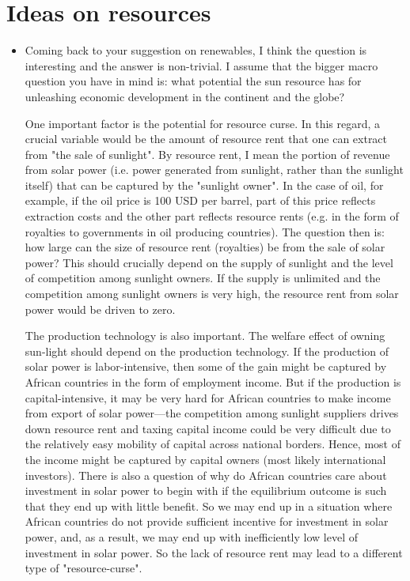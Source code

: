 \documentclass[12pt]{article}%
\begin{document}
\section{Ideas on resources}
\begin{itemize}
     
\item Coming back to your suggestion on renewables, I think the question is interesting and the answer is non-trivial. I assume that the bigger macro question you have in mind is: what potential the sun resource has for unleashing economic development in the continent and the globe? 

One important factor is the potential for resource curse. In this regard, a crucial variable would be the amount of resource rent that one can extract from "the sale of sunlight". By resource rent, I mean the portion of revenue from solar power (i.e. power generated from sunlight, rather than the sunlight itself) that can be captured by the "sunlight owner". In the case of oil, for example, if the oil price is 100 USD per barrel, part of this price reflects extraction costs and the other part reflects resource rents (e.g. in the form of royalties to governments in oil producing countries). The question then is: how large can the size of resource rent (royalties) be from the sale of solar power? This should crucially depend on the supply of sunlight and the level of competition among sunlight owners. If the supply is unlimited and the competition among sunlight owners is very high, the resource rent from solar power would be driven to zero.

The production technology is also important. The welfare effect of owning sun-light should depend on the production technology. If the production of solar power is labor-intensive, then some of the gain might be captured by African countries in the form of employment income. But if the production is capital-intensive, it may be very hard for African countries to make income from export of solar power---the competition among sunlight suppliers drives down resource rent and taxing capital income could be very difficult due to the relatively easy mobility of capital across national borders. Hence, most of the income might be captured by capital owners (most likely international investors). There is also a question of why do African countries care about investment in solar power to begin with if the equilibrium outcome is such that they end up with little benefit. So we may end up in a situation where African countries do not provide sufficient incentive for investment in solar power, and, as a result, we may end up with inefficiently low level of investment in solar power. So the lack of resource rent may lead to a different type of "resource-curse".


\end{itemize}
\end{document}
